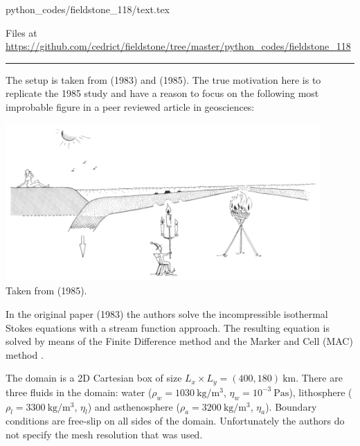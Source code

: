 \begin{flushright} {\tiny {\color{gray} python\_codes/fieldstone\_118/text.tex}} \end{flushright}



\begin{center}
Files at \url{https://github.com/cedrict/fieldstone/tree/master/python_codes/fieldstone_118}
\end{center}

\par\noindent\rule{\textwidth}{0.4pt}


The setup is taken from \textcite{mato83} (1983) and \textcite{futo85} (1985).
The true motivation here is to replicate the 1985 study 
and have a reason to focus on the following most improbable figure in a peer reviewed
article in geosciences:

\begin{center}
\includegraphics[width=12cm]{./images/interesting/futo85}\\
{\captionfont Taken from \textcite{futo85} (1985).}
\end{center}

In the original paper (1983) the authors solve the incompressible isothermal Stokes equations
with a stream function approach. The resulting equation is solved by means of the
Finite Difference method and the Marker and Cell (MAC) method \cite{hawe65}.

The domain is a 2D Cartesian box of size $L_x \times L_y=(400,180)~\si{\km}$. 
There are three fluids in the domain: 
water ($\rho_w=1030~\si{\kg\per\cubic\meter}$, $\eta_w=10^{-3}~\si{\pascal\second}$), 
lithosphere ($\rho_l=3300~\si{\kg\per\cubic\meter}$, $\eta_l$) and 
asthenosphere ($\rho_a=3200~\si{\kg\per\cubic\meter}$, $\eta_a$).
Boundary conditions are free-slip on all sides of the domain.
Unfortunately the authors do not specify the mesh resolution that was used. 

